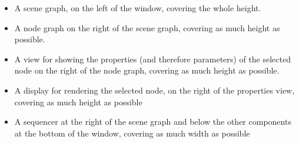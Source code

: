 \documentclass[
    a4paper,      %
    10pt,         %
    openright,    %
    notitlepage,  %
    parskip=half, %
]{scrreprt}       %
\theoremstyle{definition}                    %
\begin{document}
\begin{itemize}
\item{%
    A scene graph, on the left of the window, covering the whole height.}
\item{%
    A node graph on the right of the scene graph, covering as much height as
    possible.}
\item{%
    A view for showing the properties (and therefore parameters) of the selected
    node on the right of the node graph, covering as much height as possible.}
\item{%
    A display for rendering the selected node, on the right of the properties
    view, covering as much height as possible}
\item{%
    A sequencer at the right of the scene graph and below the other components
    at the bottom of the window, covering as much width as possible}
\end{itemize}

\end{document}

